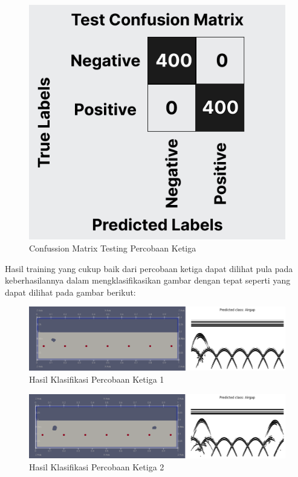 \begin{figure} [H] \centering
    \includegraphics[scale=0.3]{gambar/bab4/testcon3.png}
    \caption{Confussion Matrix Testing Percobaan Ketiga}
    \label{fig:testcon3}
\end{figure}

Hasil training yang cukup baik dari percobaan ketiga dapat dilihat pula pada keberhasilannya dalam mengklasifikasikan gambar dengan tepat seperti yang dapat dilihat pada gambar berikut:

\begin{figure} [H] \centering
    \includegraphics[scale=0.2]{gambar/bab4/Airgap 19993.png}
    \caption{Hasil Klasifikasi Percobaan Ketiga 1}
\end{figure}

\begin{figure} [H] \centering
    \includegraphics[scale=0.2]{gambar/bab4/Airgap 20003.png}
    \caption{Hasil Klasifikasi Percobaan Ketiga 2}
\end{figure}

